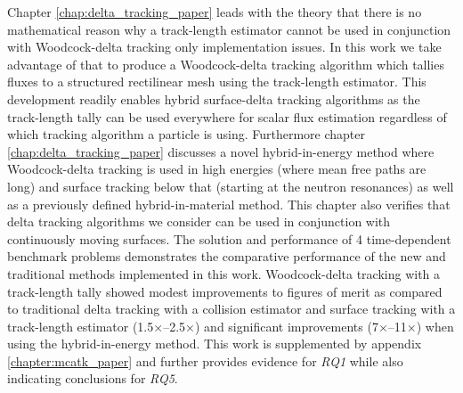 Chapter \ref{chap:delta_tracking_paper} leads with the theory that there is no mathematical reason why a track-length estimator cannot be used in conjunction with Woodcock-delta tracking only implementation issues. 
In this work we take advantage of that to produce a Woodcock-delta tracking algorithm which tallies fluxes to a structured rectilinear mesh using the track-length estimator.
This development readily enables hybrid surface-delta tracking algorithms as the track-length tally can be used everywhere for scalar flux estimation regardless of which tracking algorithm a particle is using.
Furthermore chapter \ref{chap:delta_tracking_paper} discusses a novel hybrid-in-energy method where Woodcock-delta tracking is used in high energies (where mean free paths are long) and surface tracking below that (starting at the neutron resonances) as well as a previously defined hybrid-in-material method.
This chapter also verifies that delta tracking algorithms we consider can be used in conjunction with continuously moving surfaces.
The solution and performance of 4 time-dependent benchmark problems demonstrates the comparative performance of the new and traditional methods implemented in this work.
Woodcock-delta tracking with a track-length tally showed modest improvements to figures of merit as compared to traditional delta tracking with a collision estimator and surface tracking with a track-length estimator (\num{1.5}$\times$--\num{2.5}$\times$) and significant improvements (\num{7}$\times$--\num{11}$\times$) when using the hybrid-in-energy method.
This work is supplemented by appendix \ref{chapter:mcatk_paper} and further provides evidence for \emph{RQ1} while also indicating conclusions for \emph{RQ5}.